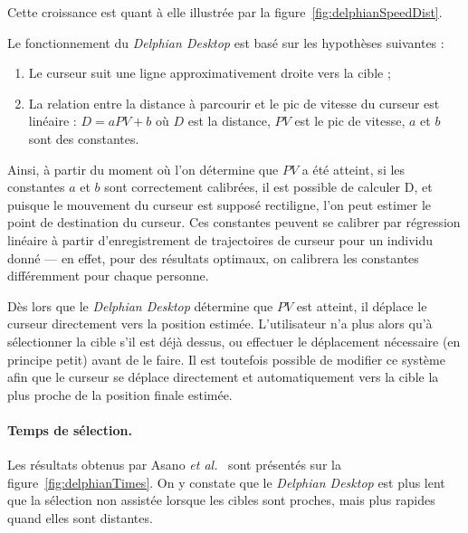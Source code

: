 	Cette croissance est quant à elle illustrée par la figure~\ref{fig:delphianSpeedDist}.
	
	Le fonctionnement du \emph{Delphian Desktop} est basé sur les hypothèses suivantes :
	
	\begin{enumerate}
		\item Le curseur suit une ligne approximativement droite vers la cible ;
		\item La relation entre la distance à parcourir et le pic de vitesse du curseur est linéaire : $D = aPV + b$ où $D$ est la distance, $PV$ est le pic de vitesse, $a$ et $b$ sont des constantes.
	\end{enumerate}
	
	Ainsi, à partir du moment où l'on détermine que $PV$ a été atteint, si les constantes $a$ et $b$ sont correctement calibrées, il est possible de calculer D, et puisque le mouvement du curseur est supposé rectiligne, l'on peut estimer le point de destination du curseur. Ces constantes peuvent se calibrer par régression linéaire à partir d'enregistrement de trajectoires de curseur pour un individu donné --- en effet, pour des résultats optimaux, on calibrera les constantes différemment pour chaque personne.
	
	Dès lors que le \emph{Delphian Desktop} détermine que $PV$ est atteint, il déplace le curseur directement vers la position estimée. L'utilisateur n'a plus alors qu'à sélectionner la cible s'il est déjà dessus, ou effectuer le déplacement nécessaire (en principe petit) avant de le faire. Il est toutefois possible de modifier ce système afin que le curseur se déplace directement et automatiquement vers la cible la plus proche de la position finale estimée.
	
	\paragraph{Temps de sélection.}
	Les résultats obtenus par Asano \emph{et al.}~\cite{asano2005predictive} sont présentés sur la figure~\ref{fig:delphianTimes}. On y constate que le \emph{Delphian Desktop} est plus lent que la sélection non assistée lorsque les cibles sont proches, mais plus rapides quand elles sont distantes.
	
